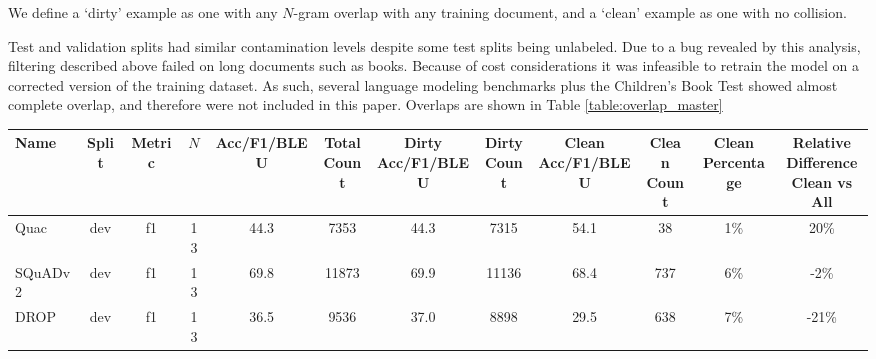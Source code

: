 \documentclass{article}
\begin{document}
We define a `dirty' example as one with any $N$-gram overlap with any training document, and a `clean' example as one with no collision.

Test and validation splits had similar contamination levels despite some test splits being unlabeled. Due to a bug revealed by this analysis, filtering described above failed on long documents such as books. Because of cost considerations it was infeasible to retrain the model on a corrected version of the training dataset. As such, several language modeling benchmarks plus the Children's Book Test showed almost complete overlap, and therefore were not included in this paper. Overlaps are shown in Table \ref{table:overlap_master}

    \begin{table}
        {
        \footnotesize
        \begin{adjustwidth}{-1.4in}{-1.4in}
    \begin{center}
    \begin{tabular}{lccccccccccc}
\toprule
                Name &  Split & Metric &   $N$ & Acc/F1/BLEU & \shortstack{Total\\Count} & \shortstack{Dirty\\Acc/F1/BLEU} & \shortstack{Dirty\\Count} & \shortstack{Clean\\Acc/F1/BLEU} & \shortstack{Clean\\Count} & \shortstack{Clean\\Percentage} & \shortstack{Relative\\Difference\\Clean vs All} \\
\midrule
                Quac &   dev &       f1 &  13 &        44.3 &                      7353 &                            44.3 &                      7315 &                            54.1 &                        38 &                             1\% &                                                20\% \\
             SQuADv2 &   dev &       f1 &  13 &        69.8 &                     11873 &                            69.9 &                     11136 &                            68.4 &                       737 &                             6\% &                                                -2\% \\
                DROP &   dev &       f1 &  13 &        36.5 &                      9536 &                            37.0 &                      8898 &                            29.5 &                       638 &                             7\% &                                               -21\% \\

\end{tabular}
\end{center}
\end{adjustwidth}}
\end{table}
\end{document}
